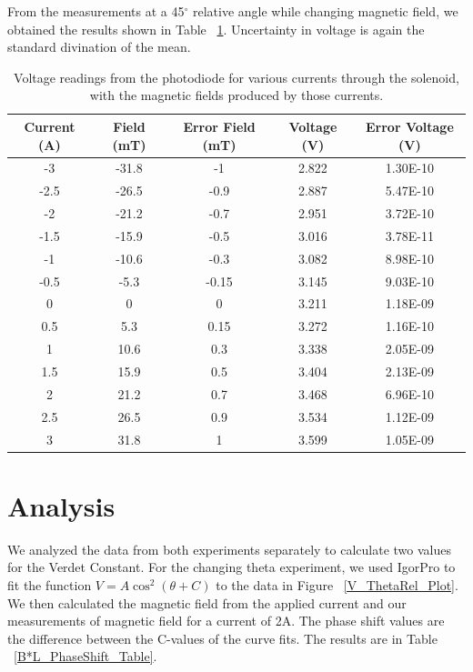 \documentclass[prb,preprint]{revtex4-1}
\begin{document}
From the measurements at a 45$^{\circ}$ relative angle while changing magnetic field, we obtained the results shown in Table ~\ref{V_I_Table}. Uncertainty in voltage is again the standard divination of the mean.

\begin{table}[h!]
\centering
\caption{Voltage readings from the photodiode for various currents through the solenoid, with the magnetic fields produced by those currents. }
\begin{ruledtabular}
\begin{tabular}{c c c c c}
Current (A) & Field (mT) & Error Field (mT) & Voltage (V) & Error Voltage (V)\\
\hline	%
-3   & -31.8 & -1 & 2.822 & 1.30E-10 \\
-2.5 & -26.5 & -0.9 & 2.887 & 5.47E-10 \\
-2   & -21.2 & -0.7 & 2.951 & 3.72E-10 \\
-1.5 & -15.9 & -0.5 & 3.016 & 3.78E-11 \\
-1   & -10.6 & -0.3 & 3.082 & 8.98E-10 \\
-0.5 & -5.3 & -0.15 & 3.145 & 9.03E-10 \\
0 & 0 & 0 & 3.211 & 1.18E-09 \\
0.5  & 5.3 & 0.15 & 3.272 & 1.16E-10 \\
1    & 10.6 & 0.3 & 3.338 & 2.05E-09 \\
1.5  & 15.9 & 0.5 & 3.404 & 2.13E-09 \\
2    & 21.2 & 0.7 & 3.468 & 6.96E-10 \\
2.5  & 26.5 & 0.9 & 3.534 & 1.12E-09 \\
3    & 31.8 & 1 & 3.599 & 1.05E-09
\end{tabular}
\end{ruledtabular}
\label{V_I_Table}
\end{table}

\section{Analysis}

We analyzed the data from both experiments separately to calculate two values for the Verdet Constant.  For the changing theta experiment, we used IgorPro to fit the function $V = A \cos ^2 (\theta + C)$ to the data in Figure ~\ref{V_ThetaRel_Plot}.  We then calculated the magnetic field from the applied current and our measurements of magnetic field for a current of 2A. The phase shift values are the difference between the C-values of the curve fits.  The results are in Table ~\ref{B*L_PhaseShift_Table}.  
\end{document}
